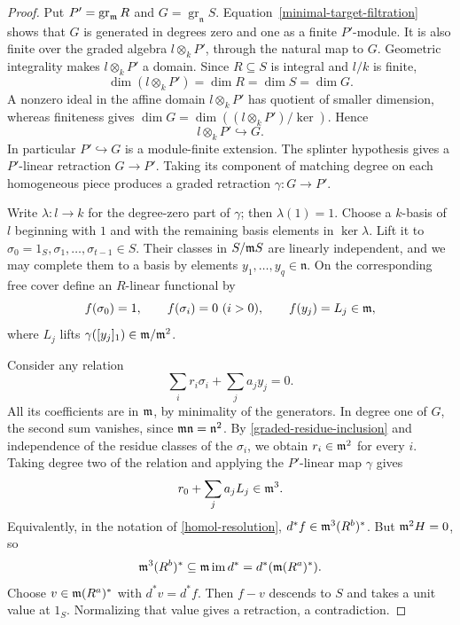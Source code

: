 \begin{proof}
Put $P'=\operatorname{gr}_{\mathfrak m}R$ and
$G=\operatorname{gr}_{\mathfrak n}S$.
Equation~\eqref{minimal-target-filtration} shows that $G$ is generated
in degrees zero and one as a finite $P'$-module.  It is also finite
over the graded algebra $l\otimes_kP'$, through the natural map to
$G$.  Geometric integrality makes $l\otimes_kP'$ a domain.  Since
$R\subseteq S$ is integral and $l/k$ is finite,
\[
 \dim(l\otimes_kP')=\dim R=\dim S=\dim G.
\]
A nonzero ideal in the affine domain $l\otimes_kP'$ has quotient
of smaller dimension, whereas finiteness gives
$\dim G=\dim((l\otimes_kP')/\ker)$.  Hence
\begin{equation}\label{graded-residue-inclusion}
 l\otimes_kP'\hookrightarrow G.
\end{equation}
In particular $P'\hookrightarrow G$ is a module-finite extension.
The splinter hypothesis gives a $P'$-linear retraction $G\to P'$.
Taking its component of matching degree on each homogeneous piece
produces a graded retraction $\gamma:G\to P'$.

Write $\lambda:l\to k$ for the degree-zero part of $\gamma$;
then $\lambda(1)=1$.  Choose a $k$-basis of $l$ beginning with $1$
and with the remaining basis elements in $\ker\lambda$.
Lift it to $\sigma_0=1_S,\sigma_1,\ldots,\sigma_{t-1}\in S$.
Their classes in $S/\mathfrak m S$ are linearly independent, and we may
complete them to a basis by elements $y_1,\ldots,y_q\in\mathfrak n$.
On the corresponding free cover define an $R$-linear functional by
\[
 f(\sigma_0)=1,\qquad f(\sigma_i)=0\ (i>0),
 \qquad f(y_j)=L_j\in\mathfrak m,
\]
where $L_j$ lifts $\gamma([y_j]_1)\in\mathfrak m/\mathfrak m^2$.

Consider any relation
\[
 \sum_i r_i\sigma_i+\sum_j a_jy_j=0.
\]
All its coefficients are in $\mathfrak m$, by minimality of the generators.
In degree one of $G$, the second sum vanishes, since
$\mathfrak m\mathfrak n=\mathfrak n^2$.  By
\eqref{graded-residue-inclusion} and independence of the residue
classes of the $\sigma_i$, we obtain $r_i\in\mathfrak m^2$ for every $i$.
Taking degree two of the relation and applying the $P'$-linear
map $\gamma$ gives
\[
 r_0+\sum_j a_jL_j\in\mathfrak m^3.
\]
Equivalently, in the notation of \eqref{homol-resolution},
$d^*f\in\mathfrak m^3(R^b)^*$.
But $\mathfrak m^2H=0$, so
\[
 \mathfrak m^3(R^b)^*\subseteq\mathfrak m\operatorname{im}d^*
                      =d^*(\mathfrak m(R^a)^*).
\]
Choose $v\in\mathfrak m(R^a)^*$ with $d^*v=d^*f$.
Then $f-v$ descends to $S$ and takes a unit value at $1_S$.
Normalizing that value gives a retraction, a contradiction.


\end{proof}
